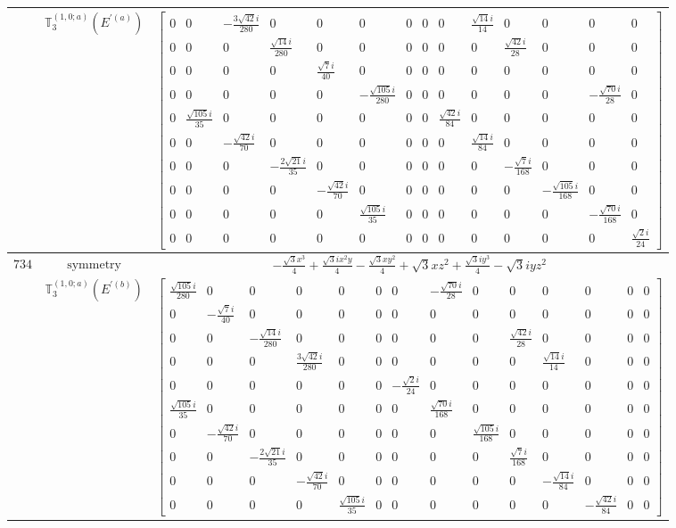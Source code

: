 \documentclass[fleqn,8pt,landscape]{jsarticle}
\begin{document}
\begin{longtable}{ccc}
$  $ & $ \mathbb{T}_{3}^{(1,0;a)}(E^{\prime(a)}) $ & $ \begin{bmatrix} 0 & 0 & - \frac{3 \sqrt{42} i}{280} & 0 & 0 & 0 & 0 & 0 & 0 & \frac{\sqrt{14} i}{14} & 0 & 0 & 0 & 0 \\ 0 & 0 & 0 & \frac{\sqrt{14} i}{280} & 0 & 0 & 0 & 0 & 0 & 0 & \frac{\sqrt{42} i}{28} & 0 & 0 & 0 \\ 0 & 0 & 0 & 0 & \frac{\sqrt{7} i}{40} & 0 & 0 & 0 & 0 & 0 & 0 & 0 & 0 & 0 \\ 0 & 0 & 0 & 0 & 0 & - \frac{\sqrt{105} i}{280} & 0 & 0 & 0 & 0 & 0 & 0 & - \frac{\sqrt{70} i}{28} & 0 \\ 0 & \frac{\sqrt{105} i}{35} & 0 & 0 & 0 & 0 & 0 & 0 & \frac{\sqrt{42} i}{84} & 0 & 0 & 0 & 0 & 0 \\ 0 & 0 & - \frac{\sqrt{42} i}{70} & 0 & 0 & 0 & 0 & 0 & 0 & \frac{\sqrt{14} i}{84} & 0 & 0 & 0 & 0 \\ 0 & 0 & 0 & - \frac{2 \sqrt{21} i}{35} & 0 & 0 & 0 & 0 & 0 & 0 & - \frac{\sqrt{7} i}{168} & 0 & 0 & 0 \\ 0 & 0 & 0 & 0 & - \frac{\sqrt{42} i}{70} & 0 & 0 & 0 & 0 & 0 & 0 & - \frac{\sqrt{105} i}{168} & 0 & 0 \\ 0 & 0 & 0 & 0 & 0 & \frac{\sqrt{105} i}{35} & 0 & 0 & 0 & 0 & 0 & 0 & - \frac{\sqrt{70} i}{168} & 0 \\ 0 & 0 & 0 & 0 & 0 & 0 & 0 & 0 & 0 & 0 & 0 & 0 & 0 & \frac{\sqrt{2} i}{24} \end{bmatrix} $ \\ \hline
$ 734 $ & $ \text{symmetry} $ & $ - \frac{\sqrt{3} x^{3}}{4} + \frac{\sqrt{3} i x^{2} y}{4} - \frac{\sqrt{3} x y^{2}}{4} + \sqrt{3} x z^{2} + \frac{\sqrt{3} i y^{3}}{4} - \sqrt{3} i y z^{2} $ \\
$  $ & $ \mathbb{T}_{3}^{(1,0;a)}(E^{\prime(b)}) $ & $ \begin{bmatrix} \frac{\sqrt{105} i}{280} & 0 & 0 & 0 & 0 & 0 & 0 & - \frac{\sqrt{70} i}{28} & 0 & 0 & 0 & 0 & 0 & 0 \\ 0 & - \frac{\sqrt{7} i}{40} & 0 & 0 & 0 & 0 & 0 & 0 & 0 & 0 & 0 & 0 & 0 & 0 \\ 0 & 0 & - \frac{\sqrt{14} i}{280} & 0 & 0 & 0 & 0 & 0 & 0 & \frac{\sqrt{42} i}{28} & 0 & 0 & 0 & 0 \\ 0 & 0 & 0 & \frac{3 \sqrt{42} i}{280} & 0 & 0 & 0 & 0 & 0 & 0 & \frac{\sqrt{14} i}{14} & 0 & 0 & 0 \\ 0 & 0 & 0 & 0 & 0 & 0 & - \frac{\sqrt{2} i}{24} & 0 & 0 & 0 & 0 & 0 & 0 & 0 \\ \frac{\sqrt{105} i}{35} & 0 & 0 & 0 & 0 & 0 & 0 & \frac{\sqrt{70} i}{168} & 0 & 0 & 0 & 0 & 0 & 0 \\ 0 & - \frac{\sqrt{42} i}{70} & 0 & 0 & 0 & 0 & 0 & 0 & \frac{\sqrt{105} i}{168} & 0 & 0 & 0 & 0 & 0 \\ 0 & 0 & - \frac{2 \sqrt{21} i}{35} & 0 & 0 & 0 & 0 & 0 & 0 & \frac{\sqrt{7} i}{168} & 0 & 0 & 0 & 0 \\ 0 & 0 & 0 & - \frac{\sqrt{42} i}{70} & 0 & 0 & 0 & 0 & 0 & 0 & - \frac{\sqrt{14} i}{84} & 0 & 0 & 0 \\ 0 & 0 & 0 & 0 & \frac{\sqrt{105} i}{35} & 0 & 0 & 0 & 0 & 0 & 0 & - \frac{\sqrt{42} i}{84} & 0 & 0 \end{bmatrix} $ \\ \hline

\end{longtable}
\end{document}
